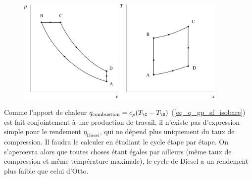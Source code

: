 		\begin{figure}
			\begin{center}
				\includegraphics[width=0.45\textwidth]{images/pv_gp_diesel.png}
				\includegraphics[width=0.45\textwidth]{images/ts_gp_diesel.png}
			\end{center}
			\label{fig_cycle_diesel}
		\end{figure}

		Comme l’apport de chaleur $q_\text{combustion} = c_p (T_\C - T_\B)$ (\ref{eq_q_gp_sf_isobare}) est fait conjointement à une production de travail, il n’existe pas d’expression simple pour le rendement $\eta_\text{Diesel}$, qui ne dépend plus uniquement du taux de compression. Il faudra le calculer en étudiant le cycle étape par étape. On s’apercevra alors que toutes choses étant égales par ailleurs (même taux de compression et même température maximale), le cycle de Diesel a un rendement plus faible que celui d’Otto.
		
